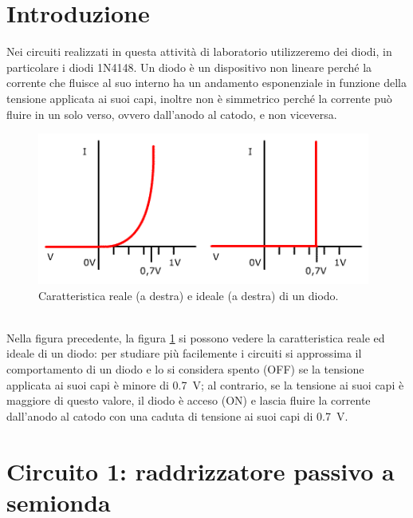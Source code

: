 \documentclass{report}
\begin{document}
\section*{Introduzione}
Nei circuiti realizzati in questa attività di laboratorio utilizzeremo dei diodi, in particolare i diodi 1N4148. Un diodo è un dispositivo non lineare perché la corrente che fluisce al suo interno ha un andamento esponenziale in funzione della tensione applicata ai suoi capi, inoltre non è simmetrico perché la corrente può fluire in un solo verso, ovvero dall'anodo al catodo, e non viceversa.
\begin{figure}[h]
	\centering
	\includegraphics[height=5cm]{immagini/diodo}
	\caption{Caratteristica reale (a destra) e ideale (a destra) di un diodo.}
	\label{figura:diodo}
\end{figure}
\\Nella figura precedente, la figura \ref{figura:diodo} si possono vedere la caratteristica reale ed ideale di un diodo: per studiare più facilemente i circuiti si approssima il comportamento di un diodo e lo si considera spento (OFF) se la tensione applicata ai suoi capi è minore di \SI{0.7}{\volt}; al contrario, se la tensione ai suoi capi è maggiore di questo valore, il diodo è acceso (ON) e lascia fluire la corrente dall'anodo al catodo con una caduta di tensione ai suoi capi di \SI{0.7}{\volt}.
\section{Circuito 1: raddrizzatore passivo a semionda}
\end{document}

